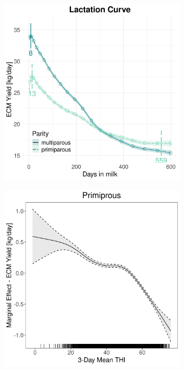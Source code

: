 \begin{figure}[H]
\begin{subfigure}[b]{0.45\textwidth}
        \includegraphics[width=\textwidth]{thesis/figures/models/ecm/full/bs_ecm_full/bs_ecm_full_marginal_dim_milk_combined.png}
    \end{subfigure}
    \begin{subfigure}[b]{0.45\textwidth}
        \centering
        \includegraphics[width=\textwidth]{thesis/figures/models/ecm/full/bs_ecm_full/bs_ecm_full_marginal_thi_milk_primi.png}

\end{subfigure}
\end{figure}
